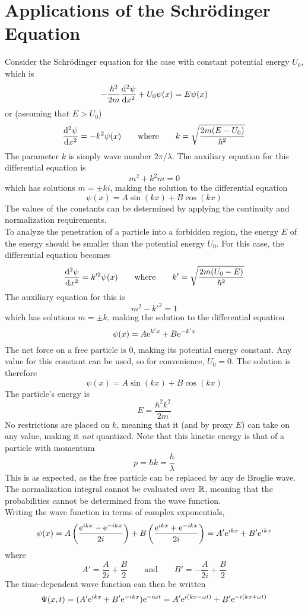 \documentclass{subfiles}
\begin{document}
	\section{Applications of the Schr\"odinger Equation}
			Consider the Schr\"odinger equation for the case with constant potential energy \(U_0\), which is
				\[-\frac{\hbar^2}{2m}\dv[2]{\psi}{x} + U_0\psi(x) = E\psi(x)\]
				or (assuming that \(E > U_0\))
				\[
					\dv[2]{\psi}{x} = -k^2\psi(x) \qquad \text{where} \qquad
						k = \sqrt{\frac{2m(E - U_0)}{\hbar^2}}
				\]
				The parameter \(k\) is simply wave number \(2\pi/\lambda\). The auxiliary equation for this differential equation is
				\[m^2 + k^2m = 0\]
				which has solutions \(m = \pm ki\), making the solution to the differential equation
				\[\psi(x) = A\sin(kx) + B\cos(kx)\]
				The values of the constants can be determined by applying the continuity and normalization requirements. \\
				To analyze the penetration of a particle into a forbidden region, the energy \(E\) of the energy should be smaller than the potential energy \(U_0\). For this case, the differential equation becomes
				\[
					\dv[2]{\psi}{x} = k'^2\psi(x) \qquad \text{where} \qquad
						k' = \sqrt{\frac{2m(U_0 - E)}{\hbar^2}}
				\]
				The auxiliary equation for this is
				\[m^2 - k'^2 = 1\]
				which has solutions \(m = \pm k\), making the solution to the differential equation
				\[\psi(x) = A\text{e}^{k'x} + B\text{e}^{-k'x}\]
			The net force on a free particle is 0, making its potential energy constant. Any value for this constant can be used, so for convenience, \(U_0 = 0\). The solution is therefore
				\[\psi(x) = A\sin(kx) + B\cos(kx)\]
				The particle's energy is
				\[E = \frac{\hbar^2k^2}{2m}\]
				No restrictions are placed on \(k\), meaning that it (and by proxy \(E\)) can take on any value, making it \textit{not} quantized. Note that this kinetic energy is that of a particle with momentum
				\[p = \hbar k = \frac{h}{\lambda}\]
				This is as expected, as the free particle can be replaced by any de Broglie wave. \\
				The normalization integral cannot be evaluated over \(\mathbb{R}\), meaning that the probabilities cannot be determined from the wave function. \\
				Writing the wave function in terms of complex exponentials,
				\[
					\psi(x) = A\left(\frac{\text{e}^{ikx} - \text{e}^{-ikx}}{2i}\right) + B\left(\frac{\text{e}^{ikx} + \text{e}^{-ikx}}{2i}\right)
						= A'\text{e}^{ikx} + B'\text{e}^{ikx}
				\]
				where
				\[
					A' = \frac{A}{2i} + \frac{B}{2} \qquad \text{and} \qquad
						B' = -\frac{A}{2i} + \frac{B}{2}
				\]
				The time-dependent wave function can then be written
				\[
					\Psi(x, t) = (A'\text{e}^{ikx} + B'\text{e}^{-ikx})\text{e}^{-i\omega t}
						= A'\text{e}^{i(kx - \omega t)} + B'\text{e}^{-i(kx + \omega t)}
				\]
\end{document}
